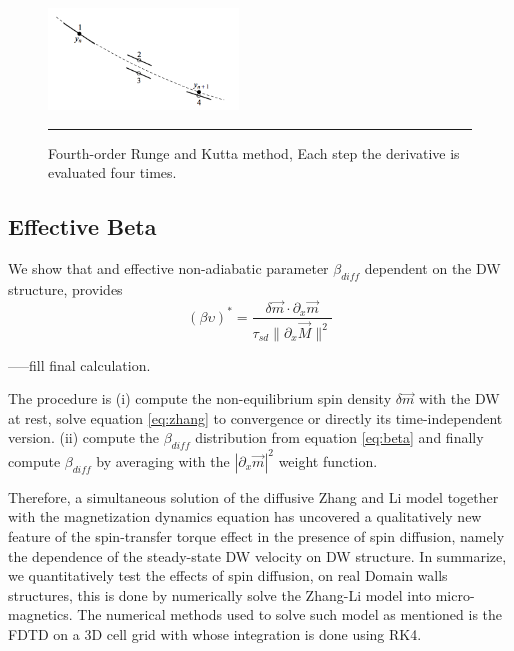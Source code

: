 \begin{figure}[htbp]
	\centering
		\includegraphics[width=0.45\textwidth]{Figures/rk4.png}
		\rule{35em}{0.5pt}
	\caption[Fourth-order Runge and Kutta Method]{Fourth-order Runge and Kutta method, Each step the derivative is evaluated four times. }
	\label{fig:kutta}
\end{figure}

\subsection{Effective Beta}

We show that and effective non-adiabatic parameter $\beta_{diff}$ dependent on the DW structure, provides 
\begin{equation} \label{eq:beta}
(\beta \upsilon)^{*} = \frac{\delta\vec{m} \cdot \partial_x \vec{m}}{\tau_{sd} \| \partial_x \vec{M} \|^2}
\end{equation}


-----fill final calculation.


The procedure is (i) compute the non-equilibrium spin density $\delta \vec{m}$ with the DW at rest, solve equation \ref{eq:zhang} to convergence or directly its time-independent version. (ii) compute the $\beta_{diff}$ distribution from equation \ref{eq:beta} and finally compute $\beta_{diff}$ by averaging with the $| \partial_x \vec{m}|^2$ weight function.


\vspace{3.5em}

Therefore, a simultaneous solution of the diffusive Zhang and Li model together with the magnetization dynamics equation has uncovered a qualitatively new feature of the spin-transfer torque effect in the presence of spin diffusion, namely the dependence of the steady-state DW velocity on DW structure. In summarize, we quantitatively test the effects of spin diffusion, on real Domain walls structures, this is done by numerically solve the Zhang-Li model into micro-magnetics. The numerical methods used to solve such model as mentioned is the FDTD on a 3D cell grid with whose integration is done using RK4.






